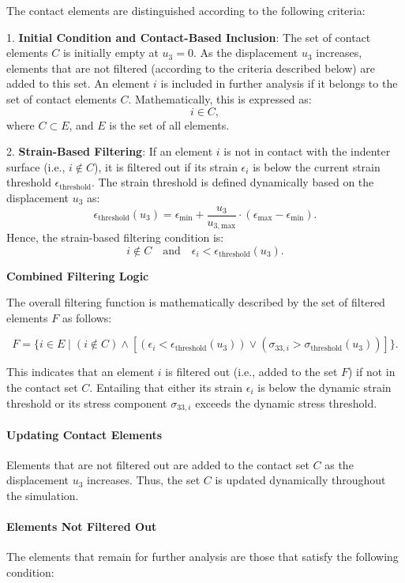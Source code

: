 The contact elements are distinguished according to the following criteria:

1. \textbf{Initial Condition and Contact-Based Inclusion}: 
   The set of contact elements \( C \) is initially empty at \( u_3 = 0 \). As the displacement \( u_3 \) increases, elements that are not filtered (according to the criteria described below) are added to this set. An element \( i \) is included in further analysis if it belongs to the set of contact elements \( C \). Mathematically, this is expressed as:
   \[
   i \in C,
   \]
   where \( C \subset E \), and \( E \) is the set of all elements.

2. \textbf{Strain-Based Filtering}:
   If an element \( i \) is not in contact with the indenter surface (i.e., \( i \notin C \)), it is filtered out if its strain \( \epsilon_i \) is below the current strain threshold \( \epsilon_{\text{threshold}} \). The strain threshold is defined dynamically based on the displacement \( u_3 \) as:
   \[
   \epsilon_{\text{threshold}}(u_3) = \epsilon_{\text{min}} + \frac{u_3}{u_{3,\text{max}}} \cdot (\epsilon_{\text{max}} - \epsilon_{\text{min}}).
   \]
   Hence, the strain-based filtering condition is:
   \[
   i \notin C \quad \text{and} \quad \epsilon_i < \epsilon_{\text{threshold}}(u_3).
   \]


\textbf{Combined Filtering Logic}

The overall filtering function is mathematically described by the set of filtered elements \( F \) as follows:

\[
F = \{ i \in E \mid (i \notin C) \wedge [(\epsilon_i < \epsilon_{\text{threshold}}(u_3)) \vee (\sigma_{33,i} > \sigma_{\text{threshold}}(u_3))] \}.
\]

This indicates that an element \( i \) is filtered out (i.e., added to the set \( F \)) if not in the contact set \( C \). Entailing that either its strain \( \epsilon_i \) is below the dynamic strain threshold or its stress component \( \sigma_{33,i} \) exceeds the dynamic stress threshold.


\paragraph{Updating Contact Elements}
Elements that are not filtered out are added to the contact set \( C \) as the displacement \( u_3 \) increases. Thus, the set \( C \) is updated dynamically throughout the simulation.

\paragraph{Elements Not Filtered Out}
The elements that remain for further analysis are those that satisfy the following condition:

